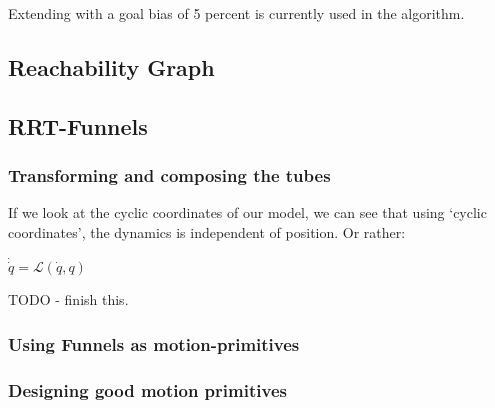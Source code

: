 Extending with a goal bias of 5 percent is currently used in the \rrtfunnel{}
algorithm. 


\subsection{Reachability Graph}

\subsection{RRT-Funnels}


\subsubsection{Transforming and composing the tubes}

If we look at the cyclic coordinates of our model, we can see that using `cyclic
coordinates', the dynamics is independent of position. Or rather:

\begin{math}
  \dot{\dot{q}} = \mathcal{L}(\dot{q},q)
\end{math}

TODO - finish this.


\subsubsection{Using Funnels as motion-primitives}

\subsubsection{Designing good motion primitives}
